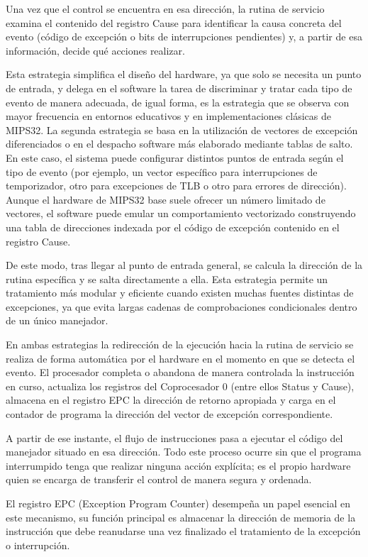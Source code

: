 \documentclass[12pt, letterpaper]{article}
\begin{document}
Una vez que el control se encuentra en esa dirección, la rutina de servicio examina el contenido del registro Cause para identificar la causa concreta del evento (código de excepción o bits de interrupciones pendientes) y, a partir de esa información, decide qué acciones realizar.

Esta estrategia simplifica el diseño del hardware, ya que solo se necesita un punto de entrada, y delega en el software la tarea de discriminar y tratar cada tipo de evento de manera adecuada, de igual forma, es la estrategia que se observa con mayor frecuencia en entornos educativos y en implementaciones clásicas de MIPS32.
La segunda estrategia se basa en la utilización de vectores de excepción diferenciados o en el despacho software más elaborado mediante tablas de salto. En este caso, el sistema puede configurar distintos puntos de entrada según el tipo de evento (por ejemplo, un vector específico para interrupciones de temporizador, otro para excepciones de TLB o otro para errores de dirección). Aunque el hardware de MIPS32 base suele ofrecer un número limitado de vectores, el software puede emular un comportamiento vectorizado construyendo una tabla de direcciones indexada por el código de excepción contenido en el registro Cause.

De este modo, tras llegar al punto de entrada general, se calcula la dirección de la rutina específica y se salta directamente a ella. Esta estrategia permite un tratamiento más modular y eficiente cuando existen muchas fuentes distintas de excepciones, ya que evita largas cadenas de comprobaciones condicionales dentro de un único manejador.

En ambas estrategias la redirección de la ejecución hacia la rutina de servicio se realiza de forma automática por el hardware en el momento en que se detecta el evento. El procesador completa o abandona de manera controlada la instrucción en curso, actualiza los registros del Coprocesador 0 (entre ellos Status y Cause), almacena en el registro EPC la dirección de retorno apropiada y carga en el contador de programa la dirección del vector de excepción correspondiente.

A partir de ese instante, el flujo de instrucciones pasa a ejecutar el código del manejador situado en esa dirección. Todo este proceso ocurre sin que el programa interrumpido tenga que realizar ninguna acción explícita; es el propio hardware quien se encarga de transferir el control de manera segura y ordenada.

El registro EPC (Exception Program Counter) desempeña un papel esencial en este mecanismo, su función principal es almacenar la dirección de memoria de la instrucción que debe reanudarse una vez finalizado el tratamiento de la excepción o interrupción. 
\end{document}
